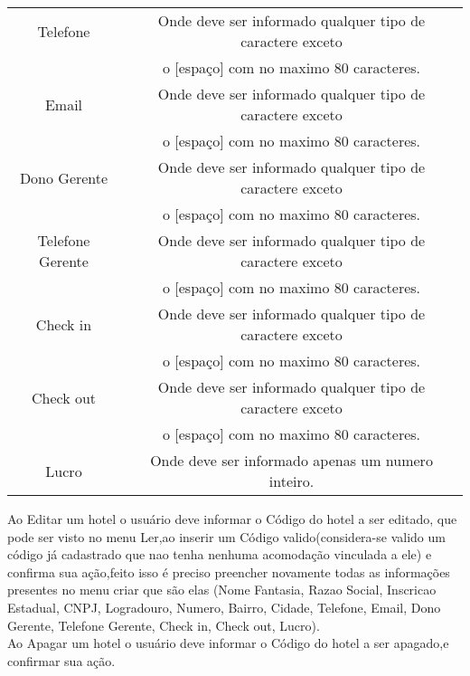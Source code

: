 \documentclass[titlepage]{article}
\begin{document}
\begin{table}[h]
\begin{tabular}{|c|c|}
						\hline
						Telefone & Onde deve ser informado qualquer tipo de caractere exceto \\ & o [espaço] com no maximo 80 caracteres.\\
						\hline
						Email & Onde deve ser informado qualquer tipo de caractere exceto \\ & o [espaço] com no maximo 80 caracteres.\\
						\hline
						Dono Gerente & Onde deve ser informado qualquer tipo de caractere exceto \\ & o [espaço] com no maximo 80 caracteres.\\
						\hline
						Telefone Gerente & Onde deve ser informado qualquer tipo de caractere exceto \\ & o [espaço] com no maximo 80 caracteres.\\
						\hline
						Check in & Onde deve ser informado qualquer tipo de caractere exceto \\ & o [espaço] com no maximo 80 caracteres.\\
						\hline
						Check out & Onde deve ser informado qualquer tipo de caractere exceto \\ & o [espaço] com no maximo 80 caracteres.\\
						\hline
						Lucro & Onde deve ser informado apenas um numero inteiro.\\
						\hline
					\end{tabular}
				\end{table}

			

				Ao Editar um hotel o usuário deve informar o Código do hotel a ser editado, que pode ser visto no menu Ler,ao inserir um Código valido(considera-se valido um código já cadastrado que nao tenha nenhuma acomodação vinculada a ele) e confirma sua ação,feito isso é preciso preencher novamente todas as informações presentes no menu criar que são elas (Nome Fantasia, Razao Social, Inscricao Estadual, CNPJ, 	Logradouro, Numero, Bairro, Cidade, 	Telefone, 	Email, 	Dono Gerente, 	Telefone Gerente, 	Check in, 	Check out, 	Lucro).\\

				Ao Apagar um hotel o usuário deve informar o Código do hotel a ser apagado,e confirmar sua ação. \\


				\newpage
\end{document}
